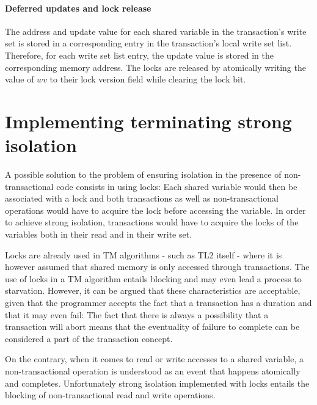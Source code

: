 \documentclass[11pt,letterpaper]{article}
\begin{document}
\paragraph{Deferred updates and lock release}
The   address  and   update  value   for  each   shared  variable   in  the
transaction{}'s write set is stored in a corresponding  
entry  in the  transaction{}'s local  write set  list. Therefore,  for each
write set list entry, the update value is stored in the  
corresponding memory address. The  locks are released by atomically writing
the value of $\mathit{wv}$ to their lock  
version field  while clearing the lock bit. 




\section{Implementing terminating strong  isolation}
\label{sec:protocol}

A possible  solution to  the problem of  ensuring isolation   in the
presence of  non-transactional code consists in using  locks: Each shared
variable would then  
be associated with a lock and both transactions as well as non-transactional 
operations would have to acquire the lock before accessing the variable. In
order  to achieve strong isolation,  transactions would have to acquire the
locks of the  variables both in their read and in their write set.

Locks are already used  in TM algorithms - such as TL2  itself - where it is
however     assumed   that  shared   memory   is   only  accessed   through
transactions. The use  of locks  in a TM algorithm  entails blocking and may
even lead a process to starvation. However,  
it can be argued that  these characteristics are acceptable, given that the
programmer  accepts the fact that a  transaction has a duration and that it
may  even  fail: The  fact  that   there is  always  a  possibility that  a
transaction will abort means that the eventuality of  
failure to complete can be considered a part of the transaction concept.  

On  the contrary,  when it  comes to  read or  write accesses  to  a shared
variable, a  non-transactional operation is  understood  as an
event  that  happens   atomically  and   completes.  Unfortunately   strong
isolation  implemented with  locks  entails the blocking  
of non-transactional read and write operations.
\end{document}

